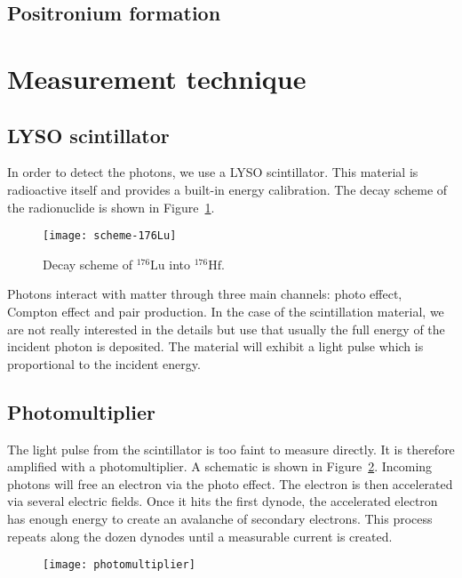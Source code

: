 \documentclass[11pt, english, fleqn, DIV=15, headinclude, BCOR=2cm]{scrreprt}
\begin{document}
\subsection{Positronium formation}




\section{Measurement technique}

\subsection{LYSO scintillator}

In order to detect the photons, we use a LYSO scintillator. This material is
radioactive itself and provides a built-in energy calibration. The decay scheme
of the radionuclide is shown in Figure~\ref{fig:scheme-176Lu}.

\begin{figure}
    \centering
    \texttt{[image: scheme-176Lu]}
    \caption{%
        Decay scheme of $^{176}\mathrm{Lu}$ into $^{176}\mathrm{Hf}$.
    }
    \label{fig:scheme-176Lu}
\end{figure}

Photons interact with matter through three main channels: photo effect, Compton
effect and pair production. In the case of the scintillation material, we are
not really interested in the details but use that usually the full energy of
the incident photon is deposited. The material will exhibit a light pulse which
is proportional to the incident energy.

\subsection{Photomultiplier}

The light pulse from the scintillator is too faint to measure directly. It is
therefore amplified with a photomultiplier. A schematic is shown in
Figure~\ref{fig:photomultiplier}. Incoming photons will free an electron via
the photo effect. The electron is then accelerated via several electric fields.
Once it hits the first dynode, the accelerated electron has enough energy to
create an avalanche of secondary electrons. This process repeats along the
dozen dynodes until a measurable current is created.

\begin{figure}
    \centering
    \texttt{[image: photomultiplier]}
    \caption{%
    }
    \label{fig:photomultiplier}
\end{figure}
\end{document}
